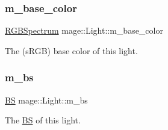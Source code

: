 \subsubsection{\texorpdfstring{m\+\_\+base\+\_\+color}{m\_base\_color}}
{\footnotesize\ttfamily \hyperlink{structmage_1_1_r_g_b_spectrum}{R\+G\+B\+Spectrum} mage\+::\+Light\+::m\+\_\+base\+\_\+color\hspace{0.3cm}{\ttfamily [private]}}

The (s\+R\+GB) base color of this light. \hypertarget{classmage_1_1_light_a926df9e12442c630d252fae852b8fc57}{}\label{classmage_1_1_light_a926df9e12442c630d252fae852b8fc57} 
\subsubsection{\texorpdfstring{m\+\_\+bs}{m\_bs}}
{\footnotesize\ttfamily \hyperlink{structmage_1_1_b_s}{BS} mage\+::\+Light\+::m\+\_\+bs\hspace{0.3cm}{\ttfamily [private]}}

The \hyperlink{structmage_1_1_b_s}{BS} of this light. 